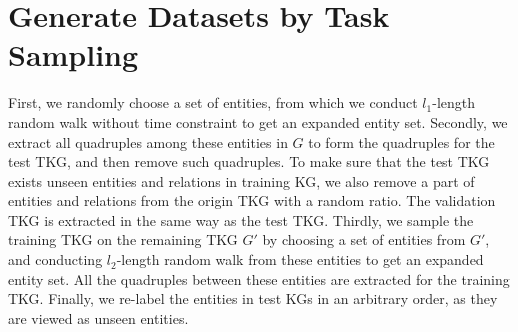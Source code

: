 \documentclass[sigconf]{acmart}
\begin{document}
\section{Generate Datasets by Task Sampling}
\label{A}
First, we randomly choose a set of entities, from which we conduct $l_{1}$-length random walk without time constraint to get an expanded entity set. Secondly, we extract all quadruples among these entities in $ {G}$ to form the quadruples for the test TKG, and then remove such quadruples. To make sure that the test TKG exists unseen entities and relations in training KG, we also remove a part of entities and relations from the origin TKG with a random ratio. The validation TKG is extracted in the same way as the test TKG. Thirdly, we sample the training TKG on the remaining TKG $ {G}'$  by choosing a set of entities from $ {G}'$, and conducting $l_{2}$-length random walk from these entities to get an expanded entity set. All the quadruples between these entities are extracted for the training TKG. Finally, we re-label the entities in test KGs in an arbitrary order, as they are viewed as unseen entities.
\end{document}
